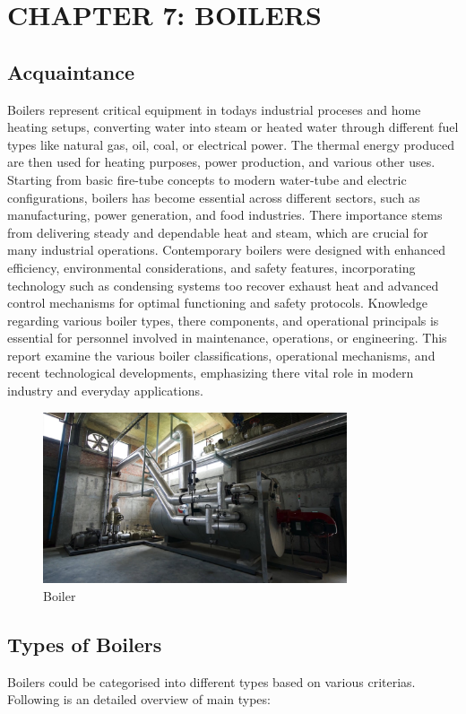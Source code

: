 \section{CHAPTER 7: BOILERS}
\subsection{Acquaintance}
Boilers represent critical equipment in todays industrial proceses and home heating setups, converting water into steam or heated water through different fuel types like natural gas, oil, coal, or electrical power. The thermal energy produced are then used for heating purposes, power production, and various other uses. Starting from basic fire-tube concepts to modern water-tube and electric configurations, boilers has become essential across different sectors, such as manufacturing, power generation, and food industries. There importance stems from delivering steady and dependable heat and steam, which are crucial for many industrial operations. Contemporary boilers were designed with enhanced efficiency, environmental considerations, and safety features, incorporating technology such as condensing systems too recover exhaust heat and advanced control mechanisms for optimal functioning and safety protocols. Knowledge regarding various boiler types, there components, and operational principals is essential for personnel involved in maintenance, operations, or engineering. This report examine the various boiler classifications, operational mechanisms, and recent technological developments, emphasizing there vital role in modern industry and everyday applications.
\begin{figure}[h]
\centering
\includegraphics[width=0.8\textwidth]{figs/boiler.jpg}
\caption{Boiler}
\label{fig:boiler}
\end{figure}


\subsection{Types of Boilers \cite{steam_boilers}}
Boilers could be categorised into different types based on various criterias. Following is an detailed overview of main types:

